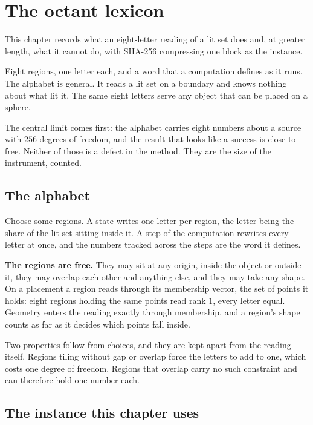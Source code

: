\chapter{The octant lexicon}

This chapter records what an eight-letter reading of a lit set does and, at greater length, what it cannot do, with SHA-256 compressing one block as the instance.

Eight regions, one letter each, and a word that a computation defines as it runs. The alphabet is general. It reads a lit set on a boundary and knows nothing about what lit it. The same eight letters serve any object that can be placed on a sphere.

The central limit comes first: the alphabet carries eight numbers about a source with \(256\) degrees of freedom, and the result that looks like a success is close to free. Neither of those is a defect in the method. They are the size of the instrument, counted.

\section{The alphabet}

Choose some regions. A state writes one letter per region, the letter being the share of the lit set sitting inside it. A step of the computation rewrites every letter at once, and the numbers tracked across the steps are the word it defines.

\textbf{The regions are free.} They may sit at any origin, inside the object or outside it, they may overlap each other and anything else, and they may take any shape. On a placement a region reads through its membership vector, the set of points it holds: eight regions holding the same points read rank \(1\), every letter equal. Geometry enters the reading exactly through membership, and a region's shape counts as far as it decides which points fall inside.

Two properties follow from choices, and they are kept apart from the reading itself. Regions tiling without gap or overlap force the letters to add to one, which costs one degree of freedom. Regions that overlap carry no such constraint and can therefore hold one number each.

\section{The instance this chapter uses}


